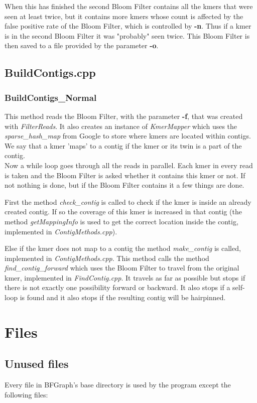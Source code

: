 \documentclass[a4paper]{report}
\renewcommand{\b}[1]{\textbf{#1}}  %
\renewcommand{\i}[1]{\textit{#1}}  %
\newcommand{\e}[1]{\emph{#1}}    %
\begin{document}
When this has finished the second Bloom Filter contains all the kmers that were seen at least twice, but it contains more kmers
whose count is affected by the false positive rate of the Bloom Filter, which is controlled by \b{-n}. Thus if a kmer is in the second Bloom Filter it was "probably" seen twice. This Bloom Filter is
then saved to a file provided by the parameter \b{-o}. 


\newpage
\section{BuildContigs.cpp}
\subsection{BuildContigs\_Normal}
This method reads the Bloom Filter, with the parameter \b{-f}, that was created with \i{FilterReads}. It also creates an instance
of \i{KmerMapper} which uses the \i{sparse\_hash\_map} from Google to store where kmers are located within contigs. We say 
that a kmer 'maps' to a contig if the kmer or its twin is a part of the contig. \\[4pt]


Now a while loop goes through all the reads in parallel. Each kmer in every read is taken and the Bloom Filter is asked whether
it contains this kmer or not. If not nothing is done, but if the Bloom Filter contains it a few things are done.

First the method \i{check\_contig} is called to check if the kmer is inside an already created contig. If so the coverage of this kmer
is increased in that contig (the method \i{getMappingInfo} is used to get the correct location inside the contig, implemented in 
\e{ContigMethods.cpp}). 

Else if the kmer does not map to a contig the method \i{make\_contig} is called, implemented in \e{ContigMethods.cpp}. 
This method calls the method \i{find\_contig\_forward} which uses the Bloom Filter to travel from the original kmer, implemented in 
\e{FindContig.cpp}. It travels as far as possible but stops if there is not exactly one possibility forward or backward. 
It also stops if a self-loop is found and it also stops if the resulting contig will be hairpinned.


\chapter{Files}

\section{Unused files}
Every file in BFGraph's base directory is used by the program except the following files:
\end{document}
